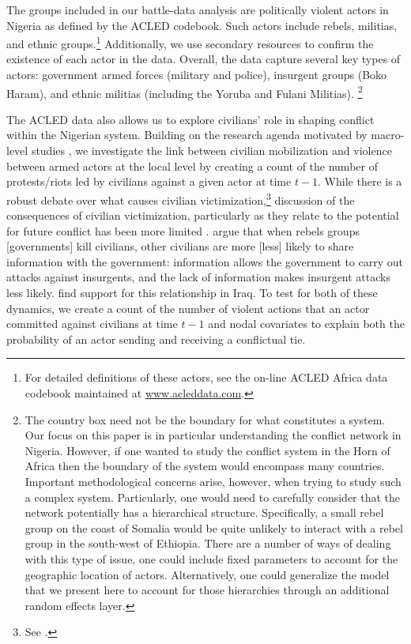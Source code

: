 The groups included in our battle-data analysis are politically violent actors in Nigeria as defined by the ACLED codebook. Such actors include rebels, militias, and ethnic groups.\footnote{For detailed definitions of these actors, see the on-line ACLED Africa data codebook maintained at \url{www.acleddata.com}.} Additionally, we use secondary resources to confirm the existence of each actor in the data. Overall, the data capture several key types of actors: government armed forces (military and police), insurgent groups (Boko Haram), and ethnic militias (including the Yoruba and Fulani Militias). \footnote{The country box need not be the boundary for what constitutes a system. Our focus on this paper is in particular understanding the conflict network in Nigeria. However, if one wanted to study the conflict system in the Horn of Africa then the boundary of the system would encompass many countries. Important methodological concerns arise, however, when trying to study such a complex system. Particularly, one would need to carefully consider that the network potentially has a hierarchical structure. Specifically, a small rebel group on the coast of Somalia would be quite unlikely to interact with a rebel group in the south-west of Ethiopia. There are a number of ways of dealing with this type of issue, one could include fixed parameters to account for the geographic location of actors. Alternatively, one could generalize the model that we present here to account for those hierarchies through an additional random effects layer. }

The ACLED data also allows us to explore civilians' role in shaping conflict within the Nigerian system.  Building on the research agenda motivated by macro-level studies \citep{tarrow:1994, tucker:2007,chenoweth:stephan:2011}, we investigate the link between civilian mobilization and violence between armed actors at the local level by creating a count of the number of protests/riots led by civilians against a given actor at time $t-1$. While there is a robust debate over what causes civilian victimization,\footnote{See \citet{humphreys:weinstein:2006, downes:2006, kalyvas:2006, prorok:appel:2014}.} discussion of the consequences of civilian victimization, particularly as they relate to the potential for future conflict has been more limited \citep{hultman:2007, raleigh:2012}. \citet{berman:matanock:2015} argue that when rebels groups [governments] kill civilians, other civilians are more [less] likely to share information with the government: information allows the government to carry out attacks against insurgents, and the lack of information makes insurgent attacks less likely. \citet{condra:shapiro:2012} find support for this relationship in Iraq. To test for both of these dynamics, we create a count of the number of violent actions that an actor committed against civilians at time $t-1$ and nodal covariates to explain both the probability of an actor sending and receiving a conflictual tie. 

